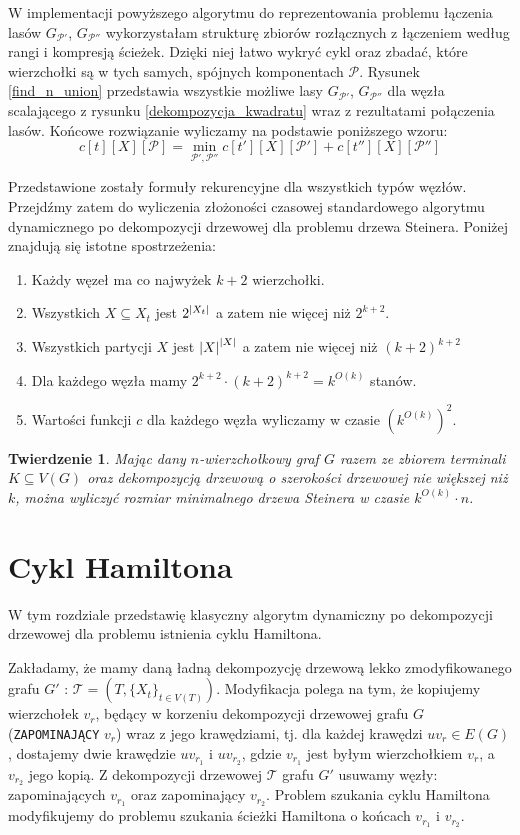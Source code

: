 \documentclass[12pt, oneside]{report}
\newtheorem{theorem}{Twierdzenie}
\newcommand\Omicron{O}
\begin{document}
W implementacji powyższego algorytmu do reprezentowania problemu łączenia lasów $G_{\mathcal{P}'}$, $G_{\mathcal{P}''}$ wykorzystałam strukturę zbiorów rozłącznych z łączeniem według rangi i kompresją ścieżek. Dzięki niej łatwo wykryć cykl oraz zbadać, które wierzchołki są w tych samych, spójnych komponentach $\mathcal{P}$. Rysunek \ref{find_n_union} przedstawia wszystkie możliwe lasy $G_{\mathcal{P}'}$, $G_{\mathcal{P}''}$ dla węzła scalającego z rysunku \ref{dekompozycja_kwadratu} wraz z rezultatami połączenia lasów.
Końcowe rozwiązanie wyliczamy na podstawie poniższego wzoru:
$$c[t][X][\mathcal{P}] = \min \limits_{\mathcal{P}', \mathcal{P}''} c[t'][X][\mathcal{P}'] + c[t''][X][\mathcal{P}'']$$

Przedstawione zostały formuły rekurencyjne dla wszystkich typów węzłów. Przejdźmy zatem do wyliczenia złożoności czasowej standardowego algorytmu dynamicznego po dekompozycji drzewowej dla problemu drzewa Steinera. Poniżej znajdują się istotne spostrzeżenia:
\begin{enumerate}[label=(\alph*)]
\item Każdy węzeł ma co najwyżek $k+2$ wierzchołki.
\item Wszystkich $X \subseteq X_t$ jest $2^{\abs{X_t}}$ a zatem nie więcej niż $2^{k+2}$.
\item Wszystkich partycji $X$ jest $\abs{X}^{\abs{X}}$ a zatem nie więcej niż $(k+2)^{k+2}$
\item Dla każdego węzła mamy $2^{k+2} \cdot (k+2)^{k+2} = k^{\Omicron(k)}$ stanów.
\item Wartości funkcji $c$ dla każdego węzła wyliczamy w czasie $(k^{\Omicron(k)})^2$.
\end{enumerate}
 
\begin{theorem}
Mając dany $n$-wierzchołkowy graf $G$ razem ze zbiorem terminali $K \subseteq V(G)$ oraz dekompozycją drzewową o szerokości drzewowej nie większej niż $k$, można wyliczyć rozmiar minimalnego drzewa Steinera w czasie $k^{\Omicron(k)} \cdot n$. 
\end{theorem}

    	\section{Cykl Hamiltona}
    	
W tym rozdziale przedstawię klasyczny algorytm dynamiczny po dekompozycji drzewowej dla problemu istnienia cyklu Hamiltona. 

Zakładamy, że mamy daną ładną dekompozycję drzewową lekko zmodyfikowanego grafu $G'$ : $\mathcal{T} = (T, \{X_t\}_{t \in V(T)})$. Modyfikacja polega na tym, że kopiujemy wierzchołek $v_r$, będący w korzeniu dekompozycji drzewowej grafu $G$ (\texttt{ZAPOMINAJĄCY} $v_r$) wraz z jego krawędziami, tj. dla każdej krawędzi $uv_r \in E(G)$, dostajemy dwie krawędzie $uv_{r_1}$ i $uv_{r_2}$, gdzie $v_{r_1}$ jest byłym wierzchołkiem $v_r$, a $v_{r_2}$ jego kopią. Z dekompozycji drzewowej $\mathcal{T}$ grafu $G'$ usuwamy węzły: zapominających $v_{r_1}$ oraz zapominający $v_{r_2}$. Problem szukania cyklu Hamiltona modyfikujemy do problemu szukania ścieżki Hamiltona o końcach $v_{r_1}$ i $v_{r_2}$.
\end{document}
